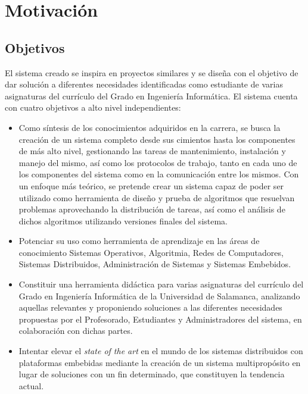 \chapter{Motivación}

\section{Objetivos}

El sistema creado se inspira en proyectos similares y se diseña con el objetivo de dar solución a diferentes necesidades identificadas como estudiante de varias asignaturas del currículo del Grado en Ingeniería Informática. El sistema cuenta con cuatro objetivos a alto nivel independientes:

\begin{itemize}
	\item Como síntesis de los conocimientos adquiridos en la carrera, se busca la creación de un sistema completo desde sus cimientos hasta los componentes de más alto nivel, gestionando las tareas de mantenimiento, instalación y manejo del mismo, así como los protocolos de trabajo, tanto en cada uno de los componentes del sistema como en la comunicación entre los mismos. Con un enfoque más teórico, se pretende crear un sistema capaz de poder ser utilizado como herramienta de diseño y prueba de algoritmos que resuelvan problemas aprovechando la distribución de tareas, así como el análisis de dichos algoritmos utilizando versiones finales del sistema.

	\item Potenciar su uso como herramienta de aprendizaje en las áreas de conocimiento Sistemas Operativos, Algoritmia, Redes de Computadores, Sistemas Distribuidos, Administración de Sistemas y Sistemas Embebidos.
	
	\item Constituir una herramienta didáctica para varias asignaturas del currículo del Grado en Ingeniería Informática de la Universidad de Salamanca, analizando aquellas relevantes y proponiendo soluciones a las diferentes necesidades propuestas por el Profesorado, Estudiantes y Administradores del sistema, en colaboración con dichas partes.

	\item Intentar elevar el \textit{state of the art} en el mundo de los sistemas distribuidos con plataformas embebidas mediante la creación de un sistema multipropósito en lugar de soluciones con un fin determinado, que constituyen la tendencia actual.
\end{itemize}

